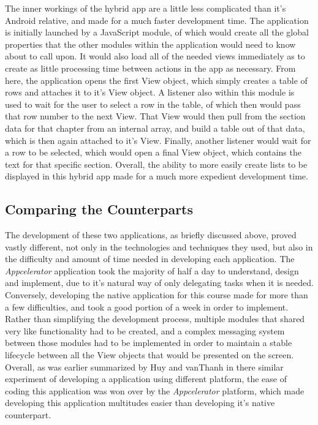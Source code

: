 \documentclass[11pt, twocolumn]{article}
\begin{document}
The inner workings of the hybrid app are a little less complicated than it's Android relative, and made for a much faster development time.  The application is initially launched by a JavaScript module, of which would create all the global properties that the other modules within the application would need to know about to call upon.  It would also load all of the needed views immediately as to create as little processing time between actions in the app as necessary.  From here, the application opens the first View object, which simply creates a table of rows and attaches it to it's View object.  A listener also within this module is used to wait for the user to select a row in the table, of which then would pass that row number to the next View.  That View would then pull from the section data for that chapter from an internal array, and build a table out of that data, which is then again attached to it's View.  Finally, another listener would wait for a row to be selected, which would open a final View object, which contains the text for that specific section.  Overall, the ability to more easily create lists to be displayed in this hybrid app made for a much more expedient development time.\\

\subsection{Comparing the Counterparts}
The development of these two applications, as briefly discussed above, proved vastly different, not only in the technologies and techniques they used, but also in the difficulty and amount of time needed in developing each application.  The {\it Appcelerator} application took the majority of half a day to understand, design and implement, due to it's natural way of only delegating tasks when it is needed.  Conversely, developing the native application for this course made for more than a few difficulties, and took a good portion of a week in order to implement.  Rather than simplifying the development process, multiple modules that shared very like functionality had to be created, and a complex messaging system between those modules had to be implemented in order to maintain a stable lifecycle between all the View objects that would be presented on the screen.  Overall, as was earlier summarized by Huy and vanThanh in there similar experiment of developing a application using different platform, the ease of coding this application was won over by the {\it Appcelerator} platform, which made developing this application multitudes easier than developing it's native counterpart.\\
\end{document}
